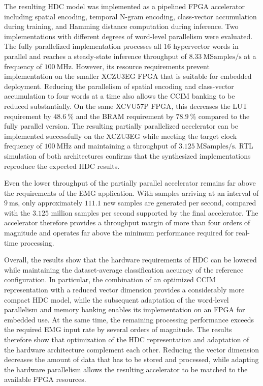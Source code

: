 The resulting HDC model was implemented as a pipelined FPGA accelerator including spatial encoding, temporal N-gram encoding, class-vector accumulation during training, and Hamming distance computation during inference. Two implementations with different degrees of word-level parallelism were evaluated. The fully parallelized implementation processes all 16 hypervector words in parallel and reaches a steady-state inference throughput of $8.33~\mathrm{MSamples/s}$ at a frequency of $100~\mathrm{MHz}$. However, its resource requirements prevent implementation on the smaller XCZU3EG FPGA that is suitable for embedded deployment. Reducing the parallelism of spatial encoding and class-vector accumulation to four words at a time also allows the CCIM banking to be reduced substantially. On the same XCVU57P FPGA, this decreases the LUT requirement by $48.6~\%$ and the BRAM requirement by $78.9~\%$ compared to the fully parallel version. The resulting partially parallelized accelerator can be implemented successfully on the XCZU3EG while meeting the target clock frequency of $100~\mathrm{MHz}$ and maintaining a throughput of $3.125~\mathrm{MSamples/s}$. RTL simulation of both architectures confirms that the synthesized implementations reproduce the expected HDC results.

Even the lower throughput of the partially parallel accelerator remains far above the requirements of the EMG application. With samples arriving at an interval of $9~\mathrm{ms}$, only approximately $111.1$ new samples are generated per second, compared with the $3.125$ million samples per second supported by the final accelerator. The accelerator therefore provides a throughput margin of more than four orders of magnitude and operates far above the minimum performance required for real-time processing.

Overall, the results show that the hardware requirements of HDC can be lowered while maintaining the dataset-average classification accuracy of the reference configuration. In particular, the combination of an optimized CCIM representation with a reduced vector dimension provides a considerably more compact HDC model, while the subsequent adaptation of the word-level parallelism and memory banking enables its implementation on an FPGA for embedded use. At the same time, the remaining processing performance exceeds the required EMG input rate by several orders of magnitude. The results therefore show that optimization of the HDC representation and adaptation of the hardware architecture complement each other. Reducing the vector dimension decreases the amount of data that has to be stored and processed, while adapting the hardware parallelism allows the resulting accelerator to be matched to the available FPGA resources.



